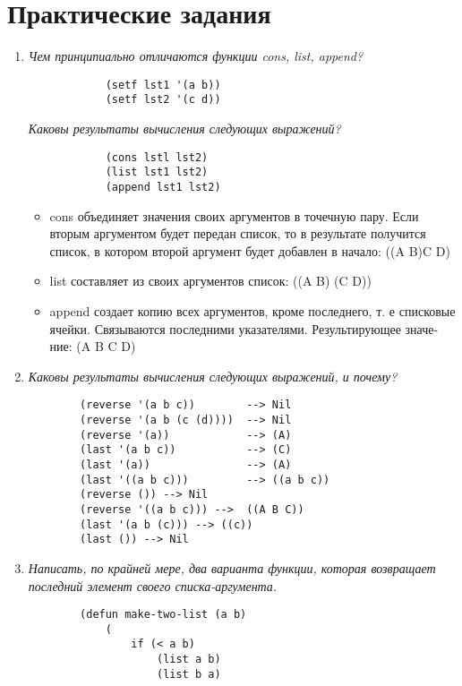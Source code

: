\chapter{Практические задания}

\begin{enumerate}[wide=0pt]

	\item \textit{Чем принципиально отличаются функции cons, list, append?}

		\begin{lstlisting}
			(setf lst1 '(a b))
			(setf lst2 '(c d))
		\end{lstlisting}

		\textit{Каковы результаты вычисления следующих выражений?}
		\begin{lstlisting}
			(cons lstl lst2)
			(list lst1 lst2)
			(append lst1 lst2)
		\end{lstlisting}

		\begin{itemize}
			\item cons объединяет значения своих аргументов в точечную пару. Если вторым
			аргументом будет передан список, то в результате получится список, в
			котором второй аргумент будет добавлен в начало: ((A B)C D)

			\item list составляет из своих аргументов список: ((A B) (C D))
			\item append создает копию всех аргументов, кроме последнего, т. е списковые
			ячейки. Связываются последними указателями. Результирующее значе-
			ние: (A B C D)
		\end{itemize}


	\item  \textit{Каковы результаты вычисления следующих выражений, и почему?}

	\begin{lstlisting}
		(reverse '(a b c)) 		  --> Nil
		(reverse '(a b (c (d))))  --> Nil
		(reverse '(a)) 			  --> (A)
		(last '(a b c)) 		  --> (C) 
		(last '(a)) 			  --> (A)
		(last '((a b c)))         --> ((a b c))
		(reverse ()) --> Nil
		(reverse '((a b c))) -->  ((A B C))
		(last '(a b (c))) --> ((c))
		(last ()) --> Nil
	\end{lstlisting}

	\item  \textit{Написать, по крайней мере, два варианта функции, 
	которая возвращает
	последний элемент своего списка-аргумента.}

	\begin{lstlisting}
		(defun make-two-list (a b)
			(
				if (< a b)
					(list a b)
					(list b a)
				

\end{lstlisting}
\end{enumerate}
